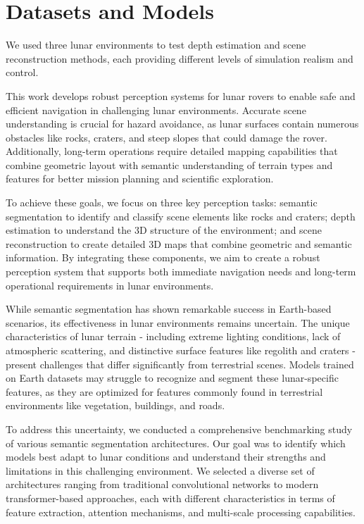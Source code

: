 \section{Datasets and Models}
We used three lunar environments to test depth estimation and scene reconstruction methods, each providing different levels of simulation realism and control.

This work develops robust perception systems for lunar rovers to enable safe and efficient navigation in challenging lunar environments. Accurate scene understanding is crucial for hazard avoidance, as lunar surfaces contain numerous obstacles like rocks, craters, and steep slopes that could damage the rover. Additionally, long-term operations require detailed mapping capabilities that combine geometric layout with semantic understanding of terrain types and features for better mission planning and scientific exploration.

To achieve these goals, we focus on three key perception tasks: semantic segmentation to identify and classify scene elements like rocks and craters; depth estimation to understand the 3D structure of the environment; and scene reconstruction to create detailed 3D maps that combine geometric and semantic information. By integrating these components, we aim to create a robust perception system that supports both immediate navigation needs and long-term operational requirements in lunar environments.

While semantic segmentation has shown remarkable success in Earth-based scenarios, its effectiveness in lunar environments remains uncertain. The unique characteristics of lunar terrain - including extreme lighting conditions, lack of atmospheric scattering, and distinctive surface features like regolith and craters - present challenges that differ significantly from terrestrial scenes. Models trained on Earth datasets may struggle to recognize and segment these lunar-specific features, as they are optimized for features commonly found in terrestrial environments like vegetation, buildings, and roads.

To address this uncertainty, we conducted a comprehensive benchmarking study of various semantic segmentation architectures. Our goal was to identify which models best adapt to lunar conditions and understand their strengths and limitations in this challenging environment. We selected a diverse set of architectures ranging from traditional convolutional networks to modern transformer-based approaches, each with different characteristics in terms of feature extraction, attention mechanisms, and multi-scale processing capabilities.

